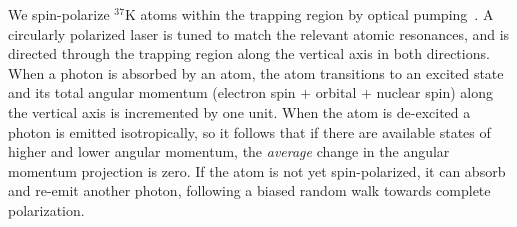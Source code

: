 


%



We spin-polarize $^{37}\textrm{K}$ atoms within the trapping region by optical pumping~\cite{ben_OP}.  A circularly polarized laser is tuned to match the relevant atomic resonances, and is directed through the trapping region along the vertical axis in both directions.  When a photon is absorbed by an atom, the atom transitions to an excited state and its total angular momentum (electron spin + orbital + nuclear spin) along the vertical axis is incremented by one unit.  When the atom is de-excited a photon is emitted isotropically, 
so it follows that if there are available states of higher and lower angular momentum, the \emph{average} change in the angular momentum projection is zero.  If the atom is not yet spin-polarized, it can absorb and re-emit another photon, following a biased random walk towards complete polarization.  

